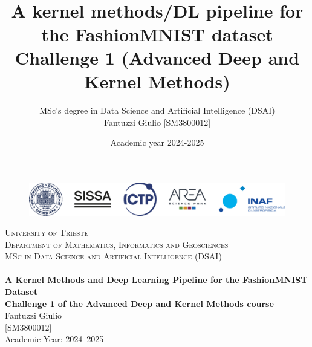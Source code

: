 \documentclass{article}
\title{ \normalsize \textsc{}
		\\ [2.0cm]
		\HRule{1.5pt} \\
		\LARGE \textbf{{A kernel methods/DL pipeline for the FashionMNIST dataset} 
		\HRule{2.0pt} \\ [0.6cm] \Large{Challenge 1 (Advanced Deep and Kernel Methods)} \vspace*{10\baselineskip}}
		}
\author{MSc's degree in Data Science and Artificial Intelligence (DSAI) \\[0.3cm]
        Fantuzzi Giulio [SM3800012]}
\date{Academic year 2024-2025}
\begin{document}
    \begin{titlepage}
        \begin{center}
            \begin{figure}[ht]
                \centering
                \includegraphics[width=\textwidth]{images/multiple_logo.png}
            \end{figure}
            \vspace{1cm}
            {\Large \textsc{University of Trieste}}\\[0.5cm]
            {\large \textsc{Department of Mathematics, Informatics and Geosciences}}\\[0.5cm]
            {\large \textsc{MSc in Data Science and Artificial Intelligence (DSAI)}}\\[3.5cm]
    
            \HRule{2pt} \\[0.4cm]
            {\LARGE \textbf{A Kernel Methods and Deep Learning Pipeline for the FashionMNIST Dataset}}\\[0.4cm]
            {\large \textbf{Challenge 1 of the Advanced Deep and Kernel Methods course}}
            \HRule{2pt} \\[4.5cm]
            {\Large Fantuzzi Giulio}\\[0.2cm]
            {\Large [SM3800012]}\\[2.5cm]
            {\Large Academic Year: 2024--2025}
        \end{center}
    \end{titlepage}
    \newpage
    
    
    
    
    
    
\end{document}
